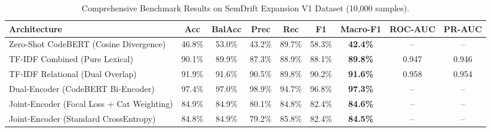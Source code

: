 \begin{table}[t]
\centering
\caption{Comprehensive Benchmark Results on SemDrift Expansion V1 Dataset (10,000 samples).}
\label{tab:expansion_v1_benchmark}
\small
\begin{tabular}{lcccccccc}
\toprule
\textbf{Architecture} & \textbf{Acc} & \textbf{BalAcc} & \textbf{Prec} & \textbf{Rec} & \textbf{F1} & \textbf{Macro-F1} & \textbf{ROC-AUC} & \textbf{PR-AUC} \\
\midrule
Zero-Shot CodeBERT (Cosine Divergence) & 46.8\% & 53.0\% & 43.2\% & 89.7\% & 58.3\% & \textbf{42.4\%} & -- & -- \\
TF-IDF Combined (Pure Lexical) & 90.1\% & 89.9\% & 87.3\% & 88.9\% & 88.1\% & \textbf{89.8\%} & 0.947 & 0.946 \\
TF-IDF Relational (Dual Overlap) & 91.9\% & 91.6\% & 90.5\% & 89.8\% & 90.2\% & \textbf{91.6\%} & 0.958 & 0.954 \\
Dual-Encoder (CodeBERT Bi-Encoder) & 97.4\% & 97.0\% & 98.9\% & 94.7\% & 96.8\% & \textbf{97.3\%} & -- & -- \\
Joint-Encoder (Focal Loss + Cat Weighting) & 84.9\% & 84.9\% & 80.1\% & 84.8\% & 82.4\% & \textbf{84.6\%} & -- & -- \\
Joint-Encoder (Standard CrossEntropy) & 84.8\% & 84.9\% & 79.2\% & 85.8\% & 82.4\% & \textbf{84.5\%} & -- & -- \\
\bottomrule
\end{tabular}
\end{table}
